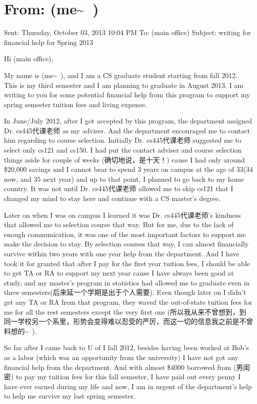 \documentclass[12pt]{book}
\begin{document}
\section{From: (me\textasciitilde{}~)}
\label{sec-47-1}
Sent: Thursday, October 03, 2013 10:04 PM
To: (main office)
Subject: writing for financial help for Spring 2013

Hi (main office),

My name is (me\textasciitilde{}~), and I am a CS graduate student starting from fall 2012. This is my third semester and I am planning to graduate in August 2013. I am writing to you for some potential financial help from this program to support my spring semester tuition fees and living expense.

In June/July 2012, after I got accepted by this program, the department assigned Dr. cs445代课老师 as my adviser. And the department encouraged me to contact him regarding to course selection. Initially Dr. cs445代课老师 suggested me to select only cs121 and cs150. I had put the contact adviser and course selection things aside for couple of weeks (确切地说，是十天！) cause I had only around \$20,000 savings and I cannot bear to spend 3 years on campus at the age of 33(34 now, and 35 next year) and up to that point, I planned to go back to my home country. It was not until Dr. cs445代课老师 allowed me to skip cs121 that I changed my mind to stay here and continue with a CS master's degree.

Later on when I was on campus I learned it was Dr. cs445代课老师's kindness that allowed me to selection course that way. But for me, due to the lack of enough communication, it was one of the most important factors to support me make the decision to stay. By selection courses that way, I can almost financially survive within two years with one year help from the department. And I have took it for granted that after I pay for the first year tuition fees, I should be able to get TA or RA to support my next year cause I have always been good at study, and my master's program in statistics had allowed me to graduate even in three semesters(后来延一个学期是出于个人需要). Even though later on I didn't get any TA or RA from that program, they waved the out-of-state tuition fees for me for all the rest semesters except the very first one (所以我从来不曾想到，到同一学校另一个系里，形势会变得难以忍受的严厉，而这一切的信息我之前是不曾料想的\textasciitilde{}~).

So far after I came back to U of I fall 2012, besides having been worked at Bob's as a labor (which was an opportunity from the university) I have not got any financial help from the department. And with almost \$4000 borrowed from (男闺密) to pay my tuition fees for this fall semester, I have paid out every penny I have ever earned during my life and now, I am in urgent of the department's help to help me survive my last spring semester.
\end{document}
